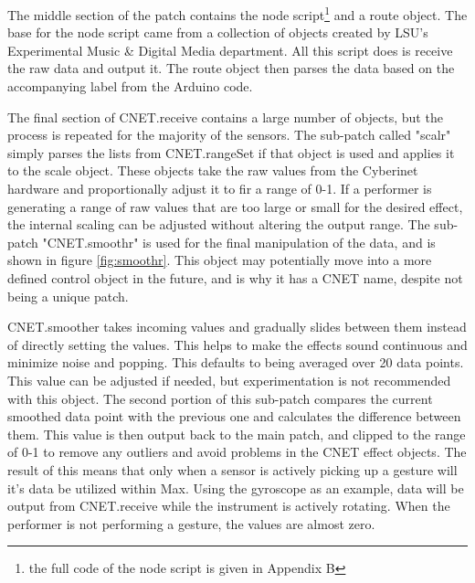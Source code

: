 The middle section of the patch contains the node script\footnote{the full code of the node script is given in Appendix B} and a route object. The base for the node script came from a collection of objects created by LSU's Experimental Music \& Digital Media department. All this script does is receive the raw data and output it. The route object then parses the data based on the accompanying label from the Arduino code.

The final section of CNET.receive contains a large number of objects, but the process is repeated for the majority of the sensors. The sub-patch called "scalr" simply parses the lists from CNET.rangeSet if that object is used and applies it to the scale object. These objects take the raw values from the Cyberinet hardware and proportionally adjust it to fir a range of 0-1. If a performer is generating a range of raw values that are too large or small for the desired effect, the internal scaling can be adjusted without altering the output range. The sub-patch "CNET.smoothr" is used for the final manipulation of the data, and is shown in figure \ref{fig:smoothr}. This object may potentially move into a more defined control object in the future, and is why it has a CNET name, despite not being a unique patch.

CNET.smoother takes incoming values and gradually slides between them instead of directly setting the values. This helps to make the effects sound continuous and minimize noise and popping. This defaults to being averaged over 20 data points. This value can be adjusted if needed, but experimentation is not recommended with this object. The second portion of this sub-patch compares the current smoothed data point with the previous one and calculates the difference between them. This value is then output back to the main patch, and clipped to the range of 0-1 to remove any outliers and avoid problems in the CNET effect objects. The result of this means that only when a sensor is actively picking up a gesture will it's data be utilized within Max. Using the gyroscope as an example, data will be output from CNET.receive while the instrument is actively rotating. When the performer is not performing a gesture, the values are almost zero.

